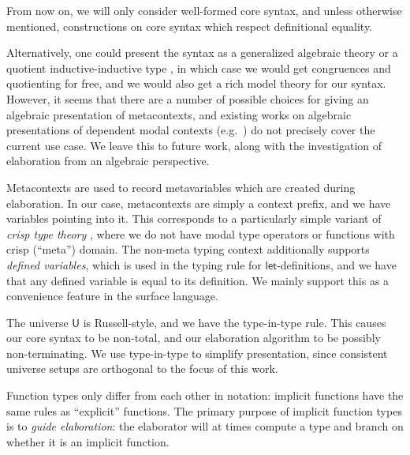 \documentclass[acmsmall,review,anonymous,prologue,dvipsnames]{acmart}\settopmatter{printfolios=true,printccs=false,printacmref=false}
\newcommand{\slet}{\boldsymbol{\mathsf{let}}}
\renewcommand{\U}{\mathsf{U}}
\theoremstyle{remark}
\begin{document}
From now on, we will only consider well-formed core syntax, and unless otherwise
mentioned, constructions on core syntax which respect definitional equality.

Alternatively, one could present the syntax as a generalized algebraic theory
\cite{sterling2019algebraic} or a quotient inductive-inductive type
\cite{ttintt}, in which case we would get congruences and quotienting for free,
and we would also get a rich model theory for our syntax. However, it seems that
there are a number of possible choices for giving an algebraic presentation of
metacontexts, and existing works on algebraic presentations of dependent modal
contexts (e.g.\ \cite{birkedal2018modal}) do not precisely cover the current use
case. We leave this to future work, along with the investigation of elaboration
from an algebraic perspective.

Metacontexts are used to record metavariables which are created during
elaboration. In our case, metacontexts are simply a context prefix, and we have
variables pointing into it. This corresponds to a particularly simple variant of
\emph{crisp type theory} \cite{licata2018internal}, where we do not have modal
type operators or functions with crisp (``meta'') domain. The non-meta typing
context additionally supports \emph{defined variables}, which is used in the
typing rule for $\slet$-definitions, and we have that any defined variable is
equal to its definition. We mainly support this as a convenience feature in the
surface language.

The universe $\U$ is Russell-style, and we have the type-in-type rule.
This causes our core syntax to be non-total, and our elaboration algorithm to be
possibly non-terminating. We use type-in-type to simplify presentation, since
consistent universe setups are orthogonal to the focus of this work.

Function types only differ from each other in notation: implicit
functions have the same rules as ``explicit'' functions. The primary purpose of
implicit function types is to \emph{guide elaboration}: the elaborator will at
times compute a type and branch on whether it is an implicit function.
\end{document}
